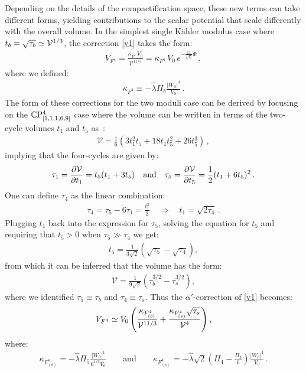 \documentclass[12pt,a4paper]{book}
\newcommand\vo{{\mathcal{V}}}
\newcommand{\V}{{\cal{V}}}
\begin{document}
Depending on the details of the compactification space, these new terms can take different forms, yielding contributions to the scalar potential that scale differently with the overall volume. In the simplest single K\"ahler modulus case where $t_b = \sqrt{\tau_b} \simeq \V^{1/3}$, the correction \eqref{v1} takes the form:
\begin{align}
V_{F^4} =  \frac{\kappa_{F^4}\,V_0}{\vo^{11/3}} = \kappa_{F^4}\, V_0\,e^{-\frac{11}{\sqrt{6}} \Phi}\,,
\label{VF4}
\end{align}
where we defined:
\begin{align}
\kappa_{F^4} \equiv - \hat{\lambda}  \Pi_b \frac{|W_0|^4}{V_0}\,.
\end{align}
The form of these corrections for the two moduli case can be derived by focusing on the $\mathbb{C} \rm{P}^4_{[1,1,1,6,9]}$ case where the volume can be written in terms of the two-cycle volumes $t_1$ and $t_5$ as~\cite{Denef:2004dm}:
\begin{align}
\vo = \frac{1}{6} (3 t_1^2 t_5 + 18 t_1 t_5^2 + 26 t_5^3)\,,
\end{align}
implying that the four-cycles are given by:
\begin{align}
\tau_1 = \frac{\partial \V}{\partial t_1} = t_5 (t_1 + 3 t_5) \quad\text{and}\quad \tau_5 = \frac{\partial \V}{\partial t_5} = \frac{1}{2} (t_1 + 6 t_5)^2\,.
\end{align}
One can define $\tau_4$ as the linear combination:
\begin{align}
\tau_4 = \tau_5 - 6 \tau_1 = \frac{t_1^2}{2} \quad \Rightarrow \quad t_1 = \sqrt{2 \tau_4}\,.
\end{align}
Plugging $t_1$ back into the expression for $\tau_5$, solving the equation for $t_5$ and requiring that $t_5 > 0$ when $\tau_5 \gg \tau_4$ we get:
\begin{align}
t_5 = \frac{1}{3 \sqrt{2}} \left(\sqrt{\tau_5} - \sqrt{\tau_4}\right),
\end{align}
from which it can be inferred that the volume has the form:
\begin{align}
\vo = \frac{1}{9 \sqrt{2}} \left(\tau_b^{3/2} - \tau_s^{3/2}\right),
\end{align}
where we identified $\tau_5 \equiv \tau_b$ and $\tau_4 \equiv \tau_s$. Thus the $\alpha'$-correction of \eqref{v1} becomes:
\begin{align}
V_{F^4} \simeq V_0 \left(\frac{\kappa_{F^4_{(b)}}}{\vo^{11/3}} + \frac{\kappa_{F^4_{(s)}} \sqrt{\tau_s}}{\V^4}\right),
\label{deltav1}
\end{align}
where:
\begin{align}
\kappa_{F^4_{(b)}} = - \hat\lambda  \Pi_5 \frac{|W_0|^4}{6^{1/3} V_0} \qquad\text{and}\qquad \kappa_{F^4_{(s)}} = -\hat\lambda \sqrt{2} \left(\Pi_4 - \frac{\Pi_5}{6}\right) \frac{|W_0|^4}{V_0} \,.
\end{align}
\end{document}
